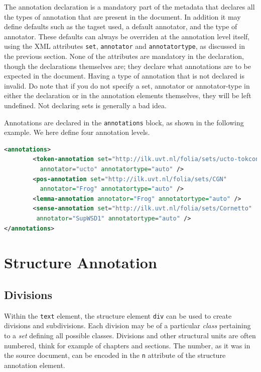 \documentclass[a4paper,12pt]{report}
\begin{document}
The annotation declaration is a mandatory part of the metadata that declares all the types of annotation that are present in the document. In addition it may define defaults such as the tagset used, a default annotator, and the type of annotator. These defaults can always be overriden at the annotation level itself, using the XML attributes \texttt{set}, \texttt{annotator} and \texttt{annotatortype}, as discussed in the previous section. None of the attributes are mandatory in the declaration, though the declarations themselves are; they declare what annotations are to be expected in the document. Having a type of annotation that is not declared is invalid. Do note that if you do not specify a set, annotator or annotator-type in either the declaration or in the annotation elements themselves, they will be left undefined. Not declaring sets is generally a bad idea.  

Annotations are declared in the \texttt{annotations} block, as shown in the following example. We here define four annotation levels.

\begin{lstlisting}[language=xml]
<annotations>
        <token-annotation set="http://ilk.uvt.nl/folia/sets/ucto-tokconfig-nl" 
          annotator="ucto" annotatortype="auto" />
        <pos-annotation set="http://ilk.uvt.nl/folia/sets/CGN" 
          annotator="Frog" annotatortype="auto" />
        <lemma-annotation annotator="Frog" annotatortype="auto" />    
        <sense-annotation set="http://ilk.uvt.nl/folia/sets/Cornetto"
         annotator="SupWSD1" annotatortype="auto" />    
</annotations>
\end{lstlisting}



\section{Structure Annotation}

\subsection{Divisions}

Within the \texttt{text} element, the structure element \texttt{div} can be used to create divisions and subdivisions. Each division may be of a particular \emph{class} pertaining to a \emph{set} defining all possible classes. Divisions and other structural units are often numbered, think for example of chapters and sections. The number, as it was in the source document, can be encoded in the \texttt{n} attribute of the structure annotation element.
\end{document}
